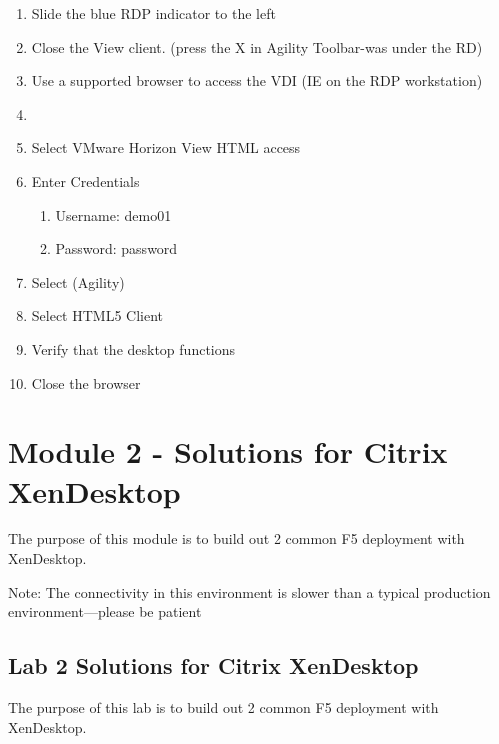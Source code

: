 \documentclass[letterpaper,10pt,english]{sphinxmanual}
\begin{document}
\begin{enumerate}
\item {} 
Slide the blue RDP indicator to the left

\item {} 
Close the View client. (press the X in Agility Toolbar-was under the
RD)

\item {} 
Use a supported browser to access the VDI (IE on the RDP
workstation)

\item {} 

\item {} 
Select VMware Horizon View HTML access

\item {} 
Enter Credentials
\begin{enumerate}
\item {} 
Username: demo01

\item {} 
Password: password

\end{enumerate}

\item {} 
Select (Agility)

\item {} 
Select HTML5 Client

\item {} 
Verify that the desktop functions

\item {} 
Close the browser

\end{enumerate}


\section{Module 2 - Solutions for Citrix XenDesktop}
\label{\detokenize{class2/module2/module2::doc}}\label{\detokenize{class2/module2/module2:module-2-solutions-for-citrix-xendesktop}}
The purpose of this module is to build out 2 common F5 deployment with
XenDesktop.

Note: The connectivity in this environment is slower than a typical
production environment—please be patient


\subsection{Lab 2 \textendash{} Solutions for Citrix XenDesktop}
\label{\detokenize{class2/module2/lab1:lab-2-solutions-for-citrix-xendesktop}}\label{\detokenize{class2/module2/lab1::doc}}
The purpose of this lab is to build out 2 common F5 deployment with
XenDesktop.
\end{document}
